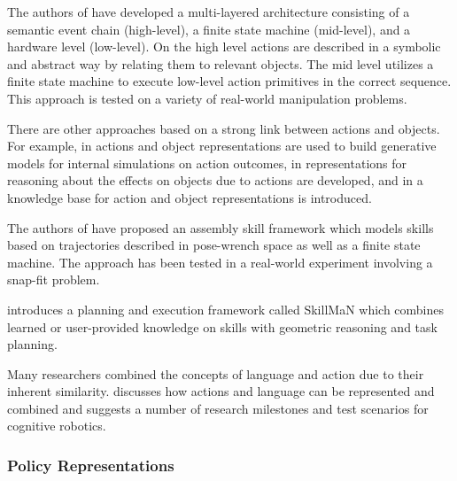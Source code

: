 The authors of \cite{Aein.2013} have developed a multi-layered architecture consisting of a semantic event chain (high-level), a finite state machine (mid-level), and a hardware level (low-level).
On the high level actions are described in a symbolic and abstract way by relating them to relevant objects.
The mid level utilizes a finite state machine to execute low-level action primitives in the correct sequence.
This approach is tested on a variety of real-world manipulation problems.

There are other approaches based on a strong link between actions and objects.
For example, in \cite{Do.2014} actions and object representations are used to build generative models for internal simulations on action outcomes, in \cite{Tenorth.2012} representations for reasoning about the effects on objects due to actions are developed, and in \cite{Tenorth.2013} a knowledge base for action and object representations is introduced.

The authors of \cite{Wahrburg.2015} have proposed an assembly skill framework which models skills based on trajectories described in pose-wrench space as well as a finite state machine.
The approach has been tested in a real-world experiment involving a snap-fit problem.

\cite{Diab.2020} introduces a planning and execution framework called SkillMaN which combines learned or user-provided knowledge on skills with geometric reasoning  and task planning.

Many researchers combined the concepts of language and action due to their inherent similarity.
\cite{Cangelosi.2010} discusses how actions and language can be represented and combined and suggests a number of research milestones and test scenarios for cognitive robotics.


\subsubsection{Policy Representations}

